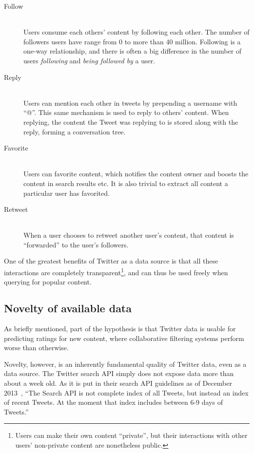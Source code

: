 \begin{description}
  \item[Follow] \hfill \\
    Users consume each others' content by following each other. The number of followers users have range from 0 to more than 40 million. Following is a one-way relationship, and there is often a big difference in the number of users \emph{following} and \emph{being followed by} a user.
  \item[Reply] \hfill \\
    Users can mention each other in tweets by prepending a username with ``@''. This same mechanism is used to reply to others' content. When replying, the content the Tweet was replying to is stored along with the reply, forming a conversation tree.
  \item[Favorite] \hfill \\
    Users can favorite content, which notifies the content owner and boosts the content in search results etc. It is also trivial to extract all content a particular user has favorited.
  \item[Retweet] \hfill \\
    When a user chooses to retweet another user's content, that content is ``forwarded'' to the user's followers.
\end{description}

One of the greatest benefits of Twitter as a data source is that all these interactions are completely transparent\footnote{Users can make their own content ``private'', but their interactions with other users' non-private content are nonetheless public.}, and can thus be used freely when querying for popular content.


\subsection{Novelty of available data} %
\label{sub:novelty_of_available_data}

As briefly mentioned, part of the hypothesis is that Twitter data is usable for predicting ratings for new content, where collaborative filtering systems perform worse than otherwise.

Novelty, however, is an inherently fundamental quality of Twitter data, even as a data source.
The Twitter search API simply does not expose data more than about a week old.
As it is put in their search API guidelines as of December 2013~\cite{UsingTwitterSearchAPI}, ``The Search API is not complete index of all Tweets, but instead an index of recent Tweets. At the moment that index includes between 6-9 days of Tweets.''

